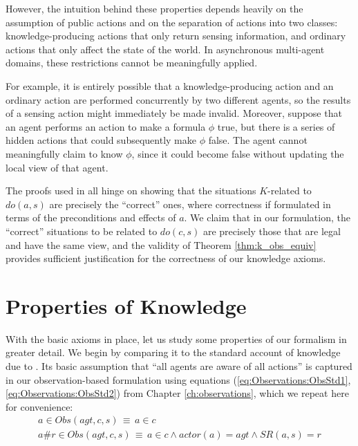 However, the intuition behind these properties depends heavily on
the assumption of public actions and on the separation of actions
into two classes: knowledge-producing actions that only return sensing
information, and ordinary actions that only affect the state of the
world. In asynchronous multi-agent domains, these restrictions cannot
be meaningfully applied.

For example, it is entirely possible that a knowledge-producing action
and an ordinary action are performed concurrently by two different
agents, so the results of a sensing action might immediately be made
invalid. Moreover, suppose that an agent performs an action to make
a formula $\phi$ true, but there is a series of hidden actions that
could subsequently make $\phi$ false. The agent cannot meaningfully
claim to know $\phi$, since it could become false without updating
the local view of that agent.

The proofs used in \citep{scherl03sc_knowledge} all hinge on showing
that the situations $K$-related to $do(a,s)$ are precisely the {}``correct''
ones, where correctness if formulated in terms of the preconditions
and effects of $a$. We claim that in our formulation, the {}``correct''
situations to be related to $do(c,s)$ are precisely those that are
legal and have the same view, and the validity of Theorem \ref{thm:k_obs_equiv}
provides sufficient justification for the correctness of our knowledge
axioms.\newpage{}


\section{Properties of Knowledge\label{sec:Knowledge:Properties}}

With the basic axioms in place, let us study some properties of our
formalism in greater detail. We begin by comparing it to the standard
account of knowledge due to \citet{scherl03sc_knowledge}. Its basic
assumption that {}``all agents are aware of all actions'' is captured
in our observation-based formulation using equations (\ref{eq:Observations:ObsStd1},\ref{eq:Observations:ObsStd2})
from Chapter \ref{ch:observations}, which we repeat here for convenience:\begin{gather*}
a\in Obs(agt,c,s)\,\equiv\, a\in c\\
a\#r\in Obs(agt,c,s)\,\equiv\, a\in c\wedge actor(a)=agt\wedge SR(a,s)=r\end{gather*}


